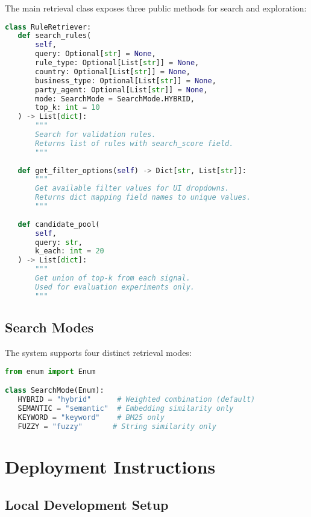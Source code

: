 The main retrieval class exposes three public methods for search and exploration:

\begin{lstlisting}[language=Python, caption={RuleRetriever public API}, label={lst:retriever-api}]
class RuleRetriever:
   def search_rules(
       self,
       query: Optional[str] = None,
       rule_type: Optional[List[str]] = None,
       country: Optional[List[str]] = None,
       business_type: Optional[List[str]] = None,
       party_agent: Optional[List[str]] = None,
       mode: SearchMode = SearchMode.HYBRID,
       top_k: int = 10
   ) -> List[dict]:
       """
       Search for validation rules.
       Returns list of rules with search_score field.
       """
       
   def get_filter_options(self) -> Dict[str, List[str]]:
       """
       Get available filter values for UI dropdowns.
       Returns dict mapping field names to unique values.
       """
       
   def candidate_pool(
       self, 
       query: str, 
       k_each: int = 20
   ) -> List[dict]:
       """
       Get union of top-k from each signal.
       Used for evaluation experiments only.
       """
\end{lstlisting}

\subsection{Search Modes}

The system supports four distinct retrieval modes:

\begin{lstlisting}[language=Python, caption={Search mode enumeration}, label={lst:search-modes}]
from enum import Enum

class SearchMode(Enum):
   HYBRID = "hybrid"      # Weighted combination (default)
   SEMANTIC = "semantic"  # Embedding similarity only
   KEYWORD = "keyword"    # BM25 only
   FUZZY = "fuzzy"       # String similarity only
\end{lstlisting}

\clearpage
\section{Deployment Instructions}
\label{sec:app-deployment}

\subsection{Local Development Setup}


